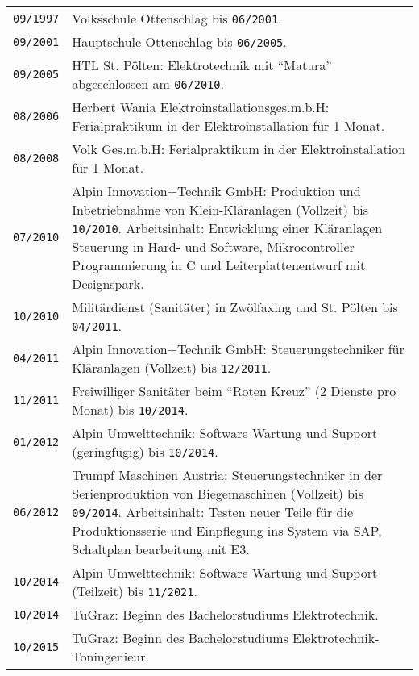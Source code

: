 {
\vspace*{0.75cm}
\\\\
\begin{tabularx}{\columnwidth}{>{\centering\arraybackslash}p{1.5cm} | p{12cm}}
  \texttt{09/1997} & Volksschule Ottenschlag bis \texttt{06/2001}.\\
  \texttt{09/2001} & Hauptschule Ottenschlag bis \texttt{06/2005}.\\
  \texttt{09/2005} & HTL St. Pölten: Elektrotechnik mit \enquote{Matura} abgeschlossen am \texttt{06/2010}.\\
  \texttt{08/2006} & Herbert Wania Elektroinstallationsges.m.b.H: Ferialpraktikum in der Elektroinstallation für 1 Monat.\\
  \texttt{08/2008} & Volk Ges.m.b.H: Ferialpraktikum in der Elektroinstallation für 1 Monat.\\
  \texttt{07/2010} & Alpin Innovation+Technik GmbH: Produktion und Inbetriebnahme von Klein-Kläranlagen (Vollzeit) bis \texttt{10/2010}. Arbeitsinhalt: Entwicklung einer Kläranlagen Steuerung in Hard- und Software, Mikrocontroller Programmierung in C und Leiterplattenentwurf mit Designspark.\\
  \texttt{10/2010} & Militärdienst (Sanitäter) in Zwölfaxing und St. Pölten bis \texttt{04/2011}.\\
  \texttt{04/2011} & Alpin Innovation+Technik GmbH: Steuerungstechniker für Kläranlagen (Vollzeit) bis \texttt{12/2011}.\\
  \texttt{11/2011} & Freiwilliger Sanitäter beim \enquote{Roten Kreuz} (2 Dienste pro Monat) bis \texttt{10/2014}.\\
  \texttt{01/2012} & Alpin Umwelttechnik: Software Wartung und Support (geringfügig) bis \texttt{10/2014}.\\
  \texttt{06/2012} & Trumpf Maschinen Austria: Steuerungstechniker in der Serienproduktion von Biegemaschinen (Vollzeit) bis \texttt{09/2014}. Arbeitsinhalt: Testen neuer Teile für die Produktionsserie und Einpflegung ins System via SAP, Schaltplan bearbeitung mit E3.\\
  \texttt{10/2014} & Alpin Umwelttechnik: Software Wartung und Support (Teilzeit) bis \texttt{11/2021}.\\
  \texttt{10/2014} & TuGraz: Beginn des Bachelorstudiums Elektrotechnik.\\
  \texttt{10/2015} & TuGraz: Beginn des Bachelorstudiums Elektrotechnik-Toningenieur.\\

\end{tabularx}}
